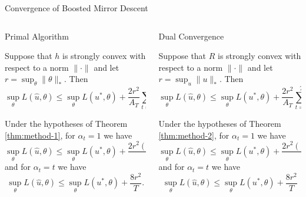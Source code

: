 \documentclass[final]{beamer}
\begin{document}
\begin{frame}{}
\begin{columns}

\begin{column}{0.48\linewidth}

\begin{block}{\large Convergence of Boosted Mirror Descent}
\begin{columns}[t]
\begin{column}{0.45\linewidth}
\begin{block}{Primal Algorithm}
\begin{theorem}
\label{thm:method-1}
Suppose that $h$ is strongly convex with respect to a norm $\|\cdot\|$ 
and let $r = \sup_{\theta} \|\theta\|_{*}$. Then 
\[ \sup_{\theta} L(\hat{u}, \theta) \leq \sup_{\theta} L(u^*, \theta) + \frac{2r^2}{A_T} \sum_{t=1}^T \frac{\alpha_{t+1}^2A_t}{A_{t+1}^2}. \]
\end{theorem}
\begin{corollary} 
\label{cor:method-1}
Under the hypotheses of Theorem \ref{thm:method-1}, for $\alpha_{t} = 1$ we have
\[ \sup_{\theta} L(\hat{u}, \theta) \leq \sup_{\theta} L(u^*, \theta) + \frac{2r^2 (\log (T) + 1)}{T}. \]
and for $\alpha_t = t$ we have
\[ \sup_{\theta} L(\hat{u}, \theta) \leq \sup_{\theta} L(u^*, \theta) + \frac{8r^2}{T}. \]
\end{corollary}
\end{block}
\end{column}

\begin{column}{0.45\linewidth}
\begin{block}{Dual Convergence}
\begin{theorem}
\label{thm:method-2}
Suppose that $R$ is strongly convex with respect to a norm $\|\cdot\|$ 
and let $r = \sup_{u} \|u\|_{*}$. Then 
\[ \sup_{\theta} L(\hat{u}, \theta) \leq \sup_{\theta} L(u^*, \theta) + \frac{2r^2}{A_T} \sum_{t=1}^T \frac{\alpha_{t+1}^2A_t}{A_{t+1}^2}. \]
\end{theorem}
\begin{corollary}
\label{cor:method-2}
Under the hypotheses of Theorem \ref{thm:method-2}, for $\alpha_t = 1$ we have
\[ \sup_{\theta} L(\hat{u}, \theta) \leq \sup_{\theta} L(u^*, \theta) + \frac{2r^2(\log(T) + 1)}{T} \]
and for $\alpha_t = t$ we have
\[ \sup_{\theta} L(\hat{u}, \theta) \leq \sup_{\theta} L(u^*, \theta) + \frac{8r^2}{T} \]
\end{corollary}
\end{block}
\end{column}
\end{columns}
\end{block}


\end{column}
\end{columns}
\end{frame}
\end{document}
